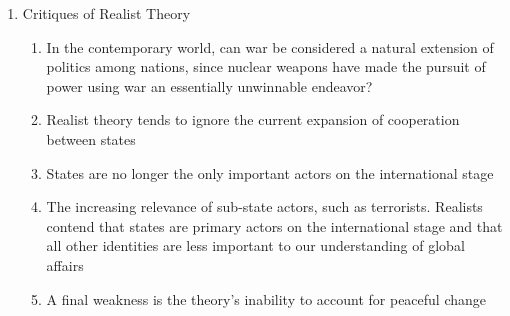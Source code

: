 \documentclass[12pt]{article}
\begin{document}
\begin{enumerate}
\begin{enumerate}
        \end{enumerate}

      \item Critiques of Realist Theory

        \begin{enumerate}

          \item In the contemporary world, can war be considered a natural extension of politics among nations, since nuclear weapons have made the pursuit of power using war an essentially unwinnable endeavor?

          \item Realist theory tends to ignore the current expansion of cooperation between states

          \item States are no longer the only important actors on the international stage

          \item The increasing relevance of sub-state actors, such as terrorists. Realists contend that states are primary actors on the international stage and that all other identities are less important to our understanding of global affairs

          \item A final weakness is the theory's inability to account for peaceful change

        \end{enumerate}

    \end{enumerate}
\end{document}
